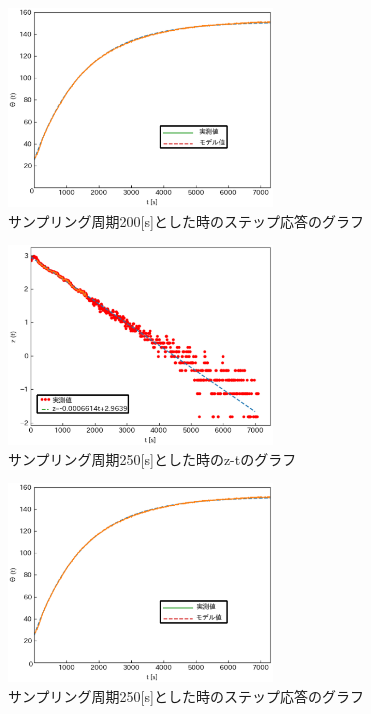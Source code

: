 \documentclass[12pt]{jsarticle}
\begin{document}
\begin{figure}[H]
  \begin{center}
    \includegraphics[clip,width=7.0cm]{../graph/step_response200s.eps}
    \caption{サンプリング周期200[s]とした時のステップ応答のグラフ}
    \label{step_response200s}
  \end{center}
\end{figure}
\begin{figure}[H]
  \begin{center}
    \includegraphics[clip,width=7.0cm]{../graph/z-t250s.eps}
    \caption{サンプリング周期250[s]とした時のz-tのグラフ}
    \label{z-t_h1=250s}
  \end{center}
\end{figure}
\begin{figure}[H]
  \begin{center}
    \includegraphics[clip,width=7.0cm]{../graph/step_response250s.eps}
    \caption{サンプリング周期250[s]とした時のステップ応答のグラフ}
    \label{step_response250s}
  \end{center}
\end{figure}
\end{document}
